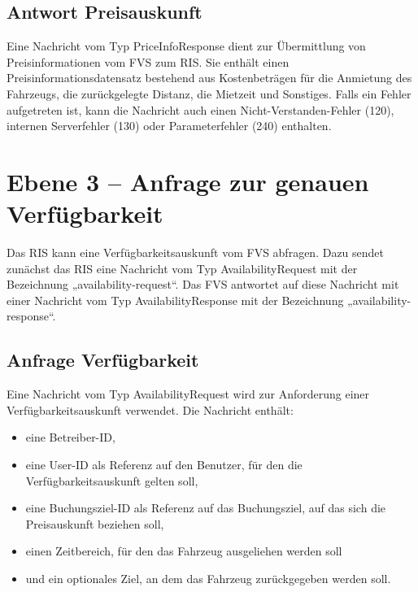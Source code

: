 

\subsection{Antwort Preisauskunft}
Eine Nachricht vom Typ PriceInfoResponse dient zur Übermittlung von Preisinformationen vom FVS zum RIS. Sie enthält einen Preisinformationsdatensatz bestehend aus Kostenbeträgen für die Anmietung des Fahrzeugs, die zurückgelegte Distanz, die Mietzeit und Sonstiges. Falls ein Fehler aufgetreten ist, kann die Nachricht auch einen Nicht-Verstanden-Fehler (120), internen Serverfehler (130) oder Parameterfehler (240) enthalten.




\section{Ebene 3 -- Anfrage zur genauen Verfügbarkeit}
Das RIS kann eine Verfügbarkeitsauskunft vom FVS abfragen. Dazu sendet zunächst das RIS eine Nachricht vom Typ AvailabilityRequest mit der Bezeichnung „availability-request“. Das FVS antwortet auf diese Nachricht mit einer Nachricht vom Typ AvailabilityResponse mit der Bezeichnung „availability-response“.



\subsection{Anfrage Verfügbarkeit}
Eine Nachricht vom Typ AvailabilityRequest wird zur Anforderung einer Verfügbarkeitsauskunft verwendet. Die Nachricht enthält:
\begin{itemize}
\item eine Betreiber-ID,
\item eine User-ID als Referenz auf den Benutzer, für den die Verfügbarkeitsauskunft gelten soll,
\item eine Buchungsziel-ID als Referenz auf das Buchungsziel, auf das sich die Preisauskunft beziehen soll,
\item einen Zeitbereich, für den das Fahrzeug ausgeliehen werden soll
\item und ein optionales Ziel, an dem das Fahrzeug zurückgegeben werden soll.
\end{itemize}

